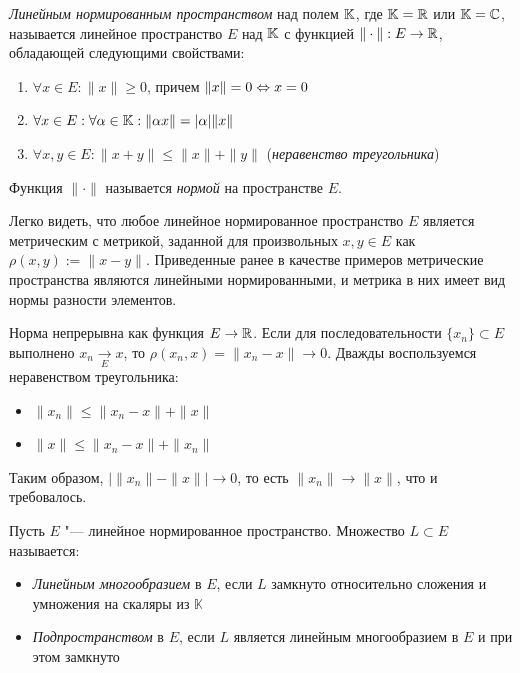 \label{seventh-bilet}
\begin{definition}
	\textit{Линейным нормированным пространством} над полем $\mathbb{K}$, где $\mathbb{K} = \mathbb{R}$ или $\mathbb{K} = \mathbb{C}$, называется линейное пространство $E$ над $\mathbb{K}$ с функцией $\|\cdot\| : E \to \mathbb{R}$, обладающей следующими свойствами:
	\begin{enumerate}
		\item $\forall x \in E: \|x\| \geqslant 0$, причем $\|x\| = 0 \Leftrightarrow x = 0$
		\item $\forall x \in E: \forall \alpha \in \mathbb{K}: \|\alpha x\| = |\alpha|\|x\|$
		\item $\forall x, y \in E: \|x + y\| \leqslant \|x\| + \|y\|$ (\textit{неравенство треугольника})
	\end{enumerate}

	Функция $\|\cdot\|$ называется \textit{нормой} на пространстве $E$.
\end{definition}

\begin{example}
    Легко видеть, что любое линейное нормированное пространство $E$ является метрическим с метрикой, заданной для произвольных $x, y \in E$ как $\rho(x, y) := \|x - y\|$. Приведенные ранее в качестве примеров метрические пространства являются линейными нормированными, и метрика в них имеет вид нормы разности элементов.
\end{example}

\begin{note}
	Норма непрерывна как функция $E \to \mathbb{R}$. Если для последовательности $\{x_n\} \subset E$ выполнено $x_n \xrightarrow[E]{} x$, то $\rho(x_n, x) = \|x_n - x\| \to 0$. Дважды воспользуемся неравенством треугольника:
	\begin{itemize}
		\item $\|x_n\| \leqslant \|x_n - x\| + \|x\|$
		\item $\|x\| \leqslant \|x_n - x\| + \|x_n\|$
	\end{itemize}

	Таким образом, $\left|\|x_n\| - \|x\|\right| \to 0$, то есть $\|x_n\| \to \|x\|$, что и требовалось.
\end{note}

\begin{definition}
	Пусть $E$ "--- линейное нормированное пространство. Множество $L \subset E$ называется:
	\begin{itemize}
		\item \textit{Линейным многообразием} в $E$, если $L$ замкнуто относительно сложения и умножения на скаляры из $\mathbb{K}$
  		\item \textit{Подпространством} в $E$, если $L$ является линейным многообразием в $E$ и при этом замкнуто 
	\end{itemize}
\end{definition}

